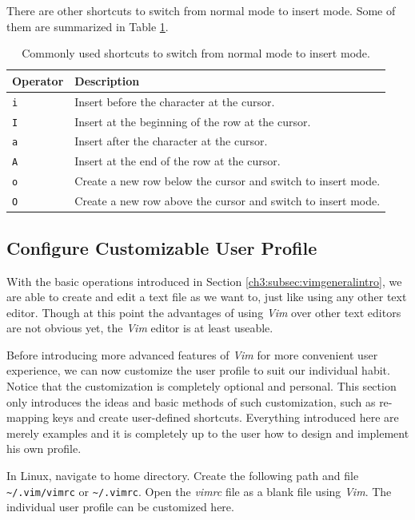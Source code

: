 There are other shortcuts to switch from normal mode to insert mode. Some of them are summarized in Table \ref{ch3tab:switchtoinsert}.

\begin{table}
  \centering \caption{Commonly used shortcuts to switch from normal mode to insert mode.}\label{ch3tab:switchtoinsert}
  \begin{tabularx}{\textwidth}{lX}
    \hline
    Operator & Description \\ \hline
    \verb|i| & Insert before the character at the cursor. \\ \hdashline
    \verb|I| & Insert at the beginning of the row at the cursor. \\ \hdashline
    \verb|a| & Insert after the character at the cursor. \\ \hdashline
    \verb|A| & Insert at the end of the row at the cursor. \\ \hdashline
    \verb|o| & Create a new row below the cursor and switch to insert mode. \\ \hdashline
    \verb|O| & Create a new row above the cursor and switch to insert mode. \\
    \hline
  \end{tabularx}
\end{table}

\subsection{Configure Customizable User Profile}

With the basic operations introduced in Section \ref{ch3:subsec:vimgeneralintro}, we are able to create and edit a text file as we want to, just like using any other text editor. Though at this point the advantages of using \textit{Vim} over other text editors are not obvious yet, the \textit{Vim} editor is at least useable.

Before introducing more advanced features of \textit{Vim} for more convenient user experience, we can now customize the user profile to suit our individual habit. Notice that the customization is completely optional and personal. This section only introduces the ideas and basic methods of such customization, such as re-mapping keys and create user-defined shortcuts. Everything introduced here are merely examples and it is completely up to the user how to design and implement his own profile.

In Linux, navigate to home directory. Create the following path and file \verb|~/.vim/vimrc| or \verb|~/.vimrc|. Open the \textit{vimrc} file as a blank file using \textit{Vim}. The individual user profile can be customized here.

